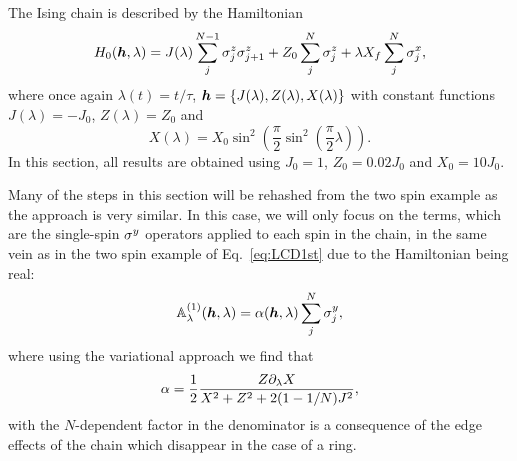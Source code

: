 The Ising chain is described by the Hamiltonian
\begin{equation}\label{eq:ising_chain_hamiltonian}
    H_0(\boldsymbol{h},\lambda) = J(\lambda) \sum_{j}^{N-1} \sigma^z_j \sigma^z_{j+1} + Z_0\sum_j^N \sigma^z_j + \lambda X_f \sum_j^N \sigma^x_j,
\end{equation}
where once again $\lambda(t) = t/\tau$, $\boldsymbol{h} = \{ J(\lambda), Z(\lambda), X(\lambda) \}$ with constant functions $J(\lambda) = -J_0$, $Z(\lambda) = Z_0$ and
\begin{equation}
    X(\lambda) = X_0 \sin^2\left(\frac{\pi}{2} \sin^2 \left( \frac{\pi}{2} \lambda \right) \right).
\end{equation}
In this section, all results are obtained using $J_0 = 1$, $Z_0 = 0.02J_0$ and $X_0 = 10J_0$.

Many of the steps in this section will be rehashed from the two spin example as the approach is very similar. In this case, we will only focus on the   terms, which are the single-spin $\sigma^y$ operators applied to each spin in the chain, in the same vein as in the two spin example  of Eq.~\ref{eq:LCD1st} due to the Hamiltonian being real:
\begin{equation}\label{eq:ising_fo_agp}
    \mathbb{A}_{\lambda}^{(1)}(\boldsymbol{h}, \lambda) = \alpha(\boldsymbol{h}, \lambda) \sum_{j}^N\sigma^y_j,
\end{equation}
where using the variational  approach we find that 
\begin{equation}
    \alpha = \frac{1}{2} \frac{Z \partial_{\lambda} X}{X^2 + Z^2 + 2(1 - 1/N)J^2},
\end{equation}
with the $N$-dependent factor in the denominator is a consequence of the edge effects of the chain which disappear in the case of a ring. 

